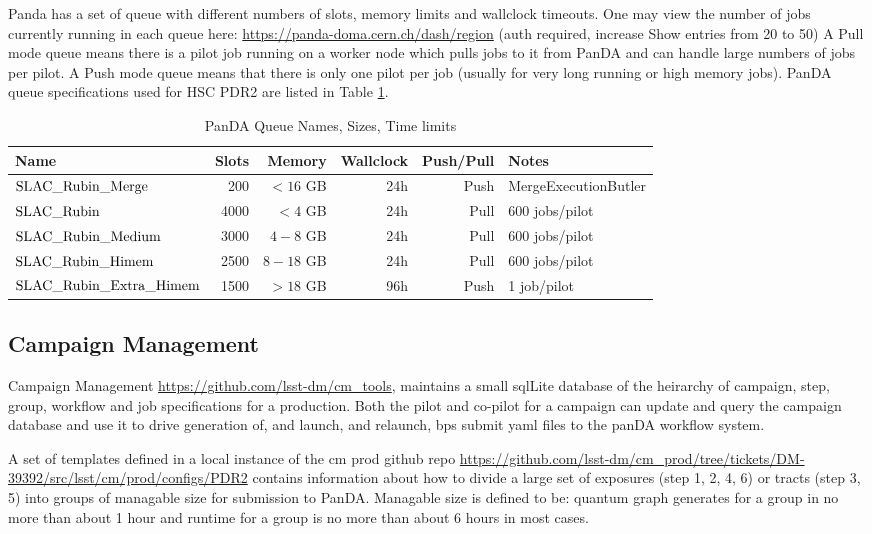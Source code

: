 Panda has a set of queue with different numbers of slots, memory limits and wallclock timeouts. 
One may view the number of jobs currently running in each queue here:
\url{https://panda-doma.cern.ch/dash/region} (auth required, increase Show entries from 20 to 50)
A Pull mode queue means there is a pilot job running on a worker node which pulls jobs to it from PanDA and
can handle large numbers of jobs per pilot.  A Push mode queue means that there is only one pilot per
job (usually for very long running or high memory jobs).   PanDA queue specifications used for
HSC PDR2 are listed in Table \ref{tab:pandaqueues}.

\normalsize 
\begin{center}
\begin{longtable}{|l|r|r|r|r|l|} 
\caption{PanDA Queue Names, Sizes, Time limits} \label{tab:pandaqueues}\\
\hline 
\textbf{Name}&\textbf{Slots}&\textbf{Memory}&\textbf{Wallclock}&\textbf{Push/Pull}&\textbf{Notes} \\ 
\hline
$\rm SLAC\_Rubin\_Merge$ & 200 & $<16$ GB & 24h & Push & MergeExecutionButler \\
$\rm SLAC\_Rubin$ & 4000 & $<4$ GB & 24h & Pull & 600 jobs/pilot \\
$\rm SLAC\_Rubin\_Medium$ & 3000 & $4-8$ GB & 24h & Pull &  600 jobs/pilot\\
$\rm SLAC\_Rubin\_Himem$ & 2500& $8-18$ GB & 24h & Pull &  600 jobs/pilot \\
$\rm SLAC\_Rubin\_Extra\_Himem$ & 1500 & $>18$ GB & 96h & Push & 1 job/pilot \\
\hline
\end{longtable} 
\end{center}
\normalsize

\subsection{Campaign Management}

Campaign Management \url{https://github.com/lsst-dm/cm_tools}, maintains a small sqlLite 
database of the heirarchy of campaign, step, group, workflow and job specifications for a production.
Both the pilot and co-pilot for a campaign can update and query the campaign database and use it to
drive generation of, and launch, and relaunch, bps submit yaml files to the panDA workflow system.

A set of templates defined in a local instance of the cm prod 
github repo \url{https://github.com/lsst-dm/cm_prod/tree/tickets/DM-39392/src/lsst/cm/prod/configs/PDR2} contains information about how to divide a large set of
exposures (step 1, 2, 4, 6) or tracts (step 3, 5) into groups of managable size for submission to PanDA.
Managable size is defined to be: quantum graph generates for a group in no more than about 1 hour and runtime
for a group is no more than about 6 hours in most cases.

